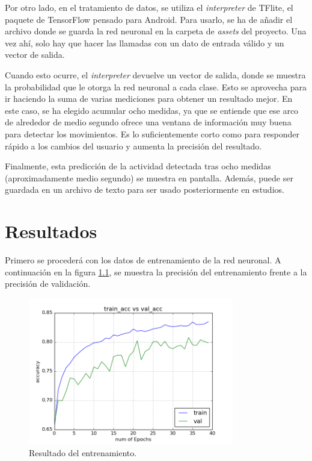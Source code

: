 \documentclass[12pt]{book}
\numberwithin{equation}{section}
\begin{document}
Por otro lado, en el tratamiento de datos, se utiliza el \textit{interpreter} de TFlite, el paquete de TensorFlow pensado para Android. Para usarlo, se ha de añadir el archivo donde se guarda la red neuronal en la carpeta de \textit{assets} del proyecto. Una vez ahí, solo hay que hacer las llamadas con un dato de entrada válido y un vector de salida.

Cuando esto ocurre, el \textit{interpreter} devuelve un vector de salida, donde se muestra la probabilidad que le otorga la red neuronal a cada clase. Esto se aprovecha para ir haciendo la suma de varias mediciones para obtener un resultado mejor. En este caso, se ha elegido acumular ocho medidas, ya que se entiende que ese arco de alrededor de medio segundo ofrece una ventana de información muy buena para detectar los movimientos. Es lo suficientemente corto como para responder rápido a los cambios del usuario y aumenta la precisión del resultado.

Finalmente, esta predicción de la actividad detectada tras ocho medidas (aproximadamente medio segundo) se muestra en pantalla. Además, puede ser guardada en un archivo de texto para ser usado posteriormente en estudios.

\newpage
\chapter{Resultados}

Primero se procederá con los datos de entrenamiento de la red neuronal. A continuación en la figura \ref{fig:possibleBF}, se muestra la precisión del entrenamiento frente a la precisión de validación. 

\begin{figure}[h]
    \centering
    \includegraphics[width=0.8\textwidth]{PossibleBF_2.png}
    \caption{Resultado del entrenamiento.}
    \label{fig:possibleBF}
\end{figure}
\end{document}

